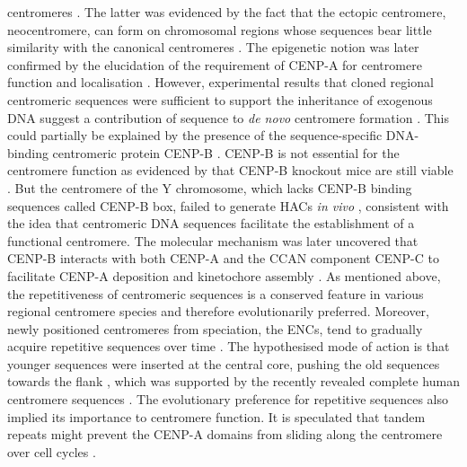 centromeres \citep{Earnshaw1985ThreeChromosome, Steiner1994AYeast, Higgins2005EngineeredPlasticity, Sato2012EpigeneticChromosomes, Sullivan1995IdentificationCentromeres, Lange2009IsodicentricPalindromes}. The latter was evidenced by the fact that the ectopic centromere, neocentromere, can form on chromosomal regions whose sequences bear little similarity with the canonical centromeres \citep{Marshall2008Neocentromeres:Evolution, Voullaire1993ACentromere, Tyler-Smith1999TransmissionGenerations, Amor2004HumanProgress}. The epigenetic notion was later confirmed by the elucidation of the requirement of CENP-A for centromere function and localisation \citep{Warburton1997ImmunolocalizationCentromeres, Vafa1997ChromatinPlate, Liu2006MappingCells, Regnier2005CENP-ABubR1, Heun2006, Mendiburo2011, Barnhart2011, Logsdon2015, Logsdon2019}. However, experimental results that cloned regional centromeric sequences were sufficient to support the inheritance of exogenous DNA suggest a contribution of sequence to \textit{de novo} centromere formation \citep{Hahnenberger1989ConstructionPombe., Haaf1992IntegrationSegregation, Harrington1997FormationMicrochromosomes, Ikeno1998ConstructionChromosomes}. This could partially be explained by the presence of the sequence-specific DNA-binding centromeric protein CENP-B \citep{Masumoto1989ASatellite., Muro1992CentromereBox., Earnshaw1985IdentificationScleroderma}. CENP-B is not essential for the centromere function as evidenced by that CENP-B knockout mice are still viable \citep{Kapoor1998TheMice, Perez-Castro1998CentromericAbnormalities, Hudson1998CentromereWeights}. But the centromere of the Y chromosome, which lacks CENP-B binding sequences called CENP-B box, failed to generate HACs \textit{in vivo} \citep{Harrington1997FormationMicrochromosomes, Grimes2002-SatelliteFormation}, consistent with the idea that centromeric DNA sequences facilitate the establishment of a functional centromere. The molecular mechanism was later uncovered that CENP-B interacts with both CENP-A and the CCAN component CENP-C to facilitate CENP-A deposition and kinetochore assembly \citep{Chardon2022CENP-B-mediatedCentromeres, Fachinetti2013, Fachinetti2015, Fujita2015StableNucleosome}. As mentioned above, the repetitiveness of centromeric sequences is a conserved feature in various regional centromere species and therefore evolutionarily preferred. Moreover, newly positioned centromeres from speciation, the ENCs, tend to gradually acquire repetitive sequences over time \citep{Rocchi2011CentromereMammals, Kasai2003ChromosomeEvolution}. The hypothesised mode of action is that younger sequences were inserted at the central core, pushing the old sequences towards the flank \citep{Locke2011ComparativeGenomes, Piras2010UncouplingEquus, Ventura2001CentromereEvolution, Kalitsis2012TheCentromere}, which was supported by the recently revealed complete human centromere sequences \citep{Logsdon2021The8}. The evolutionary preference for repetitive sequences also implied its importance to centromere function. It is speculated that tandem repeats might prevent the CENP-A domains from sliding along the centromere over cell cycles \citep{Nergadze2018BirthDomains}. 

